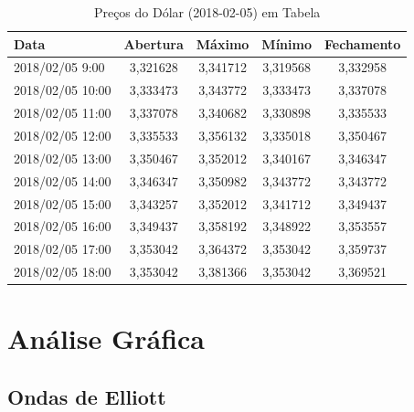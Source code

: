 \documentclass[12pt]{article}
\begin{document}
\begin{table}[H]
	\centering
	\caption{Preços do Dólar (2018-02-05) em Tabela}
	\label{tab:prices_table}
	\begin{tabular}{l c c c c}
		\textbf{Data} & \textbf{Abertura} & \textbf{Máximo} & \textbf{Mínimo} & \textbf{Fechamento} \\
		\toprule
		2018/02/05 9:00 & 3,321628 & 3,341712 & 3,319568 & 3,332958\\
		\midrule
		2018/02/05 10:00 & 3,333473 & 3,343772 & 3,333473 & 3,337078\\
		\midrule
		2018/02/05 11:00 & 3,337078 & 3,340682 & 3,330898 & 3,335533\\
		\midrule
		2018/02/05 12:00 & 3,335533 & 3,356132 & 3,335018 & 3,350467\\
		\midrule
		2018/02/05 13:00 & 3,350467 & 3,352012 & 3,340167 & 3,346347\\
		\midrule
		2018/02/05 14:00 & 3,346347 & 3,350982 & 3,343772 & 3,343772\\
		\midrule
		2018/02/05 15:00 & 3,343257 & 3,352012 & 3,341712 & 3,349437\\
		\midrule
		2018/02/05 16:00 & 3,349437 & 3,358192 & 3,348922 & 3,353557\\
		\midrule
		2018/02/05 17:00 & 3,353042 & 3,364372 & 3,353042 & 3,359737\\
		\midrule
		2018/02/05 18:00 & 3,353042 & 3,381366 & 3,353042 & 3,369521
	\end{tabular}
\end{table}

\newpage

\section{Análise Gráfica}
\subsection{Ondas de Elliott} \label{sec:Elliott-Waves}

\end{document}
